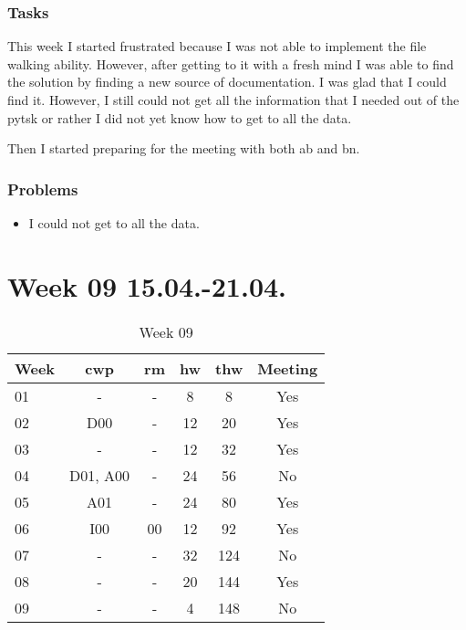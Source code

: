 \subsubsection{Tasks}

This week I started frustrated because I was not able to implement the file walking ability. However, after getting to it with a fresh mind I was able to find the solution by finding a new source of documentation. I was glad that I could find it. However, I still could not get all the information that I needed out of the \gls{pytsk} or rather I did not yet know how to get to all the data.

Then I started preparing for the meeting with both \gls{ab} and \gls{bn}.

\subsubsection{Problems}

\begin{itemize}
    \item I could not get to all the data.
\end{itemize}

\section{Week 09 15.04.-21.04.}
\label{sec:journal:week09}

\begin{table}[!ht]
    \begin{center}
        \caption{Week 09}
        \label{tab:journal:week09}
        \begin{tabular}{l|c|c|c|c|c}
            \textbf{Week} & \textbf{\gls{cwp}} & \textbf{\gls{rm}} & \textbf{\gls{hw}} & \textbf{\gls{thw}} & \textbf{Meeting}\\
        \hline
        01 & - & - & 8 & 8 & Yes \\
        02 & D00 & - & 12 & 20 & Yes \\
        03 & - & - & 12 & 32 & Yes \\
        04 & D01, A00 & - & 24 & 56 & No \\
        05 & A01 & - & 24 & 80 & Yes \\
        06 & I00 & 00 & 12 & 92 & Yes \\
        07 & - & - & 32 & 124 & No \\
        08 & - & - & 20 & 144 & Yes \\
        09 & - & - & 4 & 148 & No \\
        \end{tabular}
    \end{center}
\end{table}

